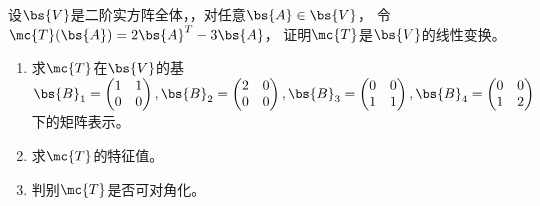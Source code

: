 \documentclass[12pt, a4paper, oneside, UTF8]{ctexbook}
\begin{document}
\begin{question}
    设$\bs{V}$是二阶实方阵全体，，对任意$\bs{A}\in \bs{V}$，
    令$\mc{T}(\bs{A})=2\bs{A}^T-3\bs{A}$，
    证明$\mc{T}$是$\bs{V}$的线性变换。
    \begin{enumerate}[label=(\arabic{*})]
        \item 求$\mc{T}$在$\bs{V}$的基$\bs{B}_1=\begin{pmatrix}
            1&1\\
            0&0
        \end{pmatrix},\bs{B}_2=\begin{pmatrix}
            2&0\\
            0&0
        \end{pmatrix},\bs{B}_3=\begin{pmatrix}
            0&0\\
            1&1
        \end{pmatrix},\bs{B}_4=\begin{pmatrix}
            0&0\\
            1&2
        \end{pmatrix}$下的矩阵表示。
        \item 求$\mc{T}$的特征值。
        \item 判别$\mc{T}$是否可对角化。
    \end{enumerate}
\end{question}
\end{document}

